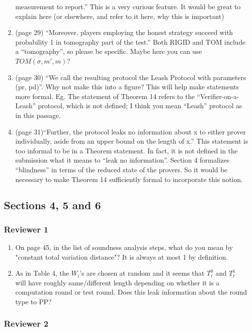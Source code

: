 \documentclass[12pt]{article}
\begin{document}
\begin{enumerate}
measurement to report.'' This is a very curious feature. It would be great to explain here (or elsewhere, and refer to it here, why this is important)
\item (page 29) ``Moreover, players employing the honest strategy succeed with probability 1 in tomography part of the
test.'' Both RIGID and TOM include a ``tomography'', so please be specific. Maybe here you can use $TOM(\sigma,m',m)$?
\item (page 30) ``We call the resulting protocol the Leash Protocol with parameters (pr, pd)''. Why not make this into a figure? This will help make statements more formal. Eg. The statement of Theorem 14 refers to the ``Verifier-on-a-Leash'' protocol, which is not defined; I think you mean ``Leash'' protocol as in this passage.
    \item (page 31)``Further, the protocol leaks no information about x to either prover individually, aside from an upper bound
on the length of x.'' This statement is too informal to be in a Theorem statement. In fact, it is not defined in the submission what it means to ``leak no information''. Section 4 formalizes ``blindness'' in terms of the reduced state of the provers. So it would be necessary to make Theorem 14 sufficiently formal to incorporate this notion.

\end{enumerate}


\subsection*{Sections 4, 5 and 6}
\subsubsection*{Reviewer 1}
\begin{enumerate}
\item On page 45, in the list of soundness analysis steps, what do you mean by "constant total variation distance"? It is always at most 1 by definition.
\item As in Table 4, the $W_i$'s are chosen at random and it seems that $T^0_\ell$ and $T^1_\ell$ will have roughly same/different length depending on whether it is a computation round or test round. Does this leak information about the round type to PP?

\end{enumerate}

\subsubsection*{Reviewer 2}
\end{document}
